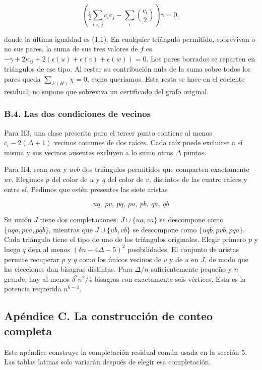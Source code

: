 \documentclass[spanish,11pt,a4paper]{article}
\begin{document}
\[\left(\tfrac12\sum_{i<j}c_ic_j-\sum_i\binom{c_i}{2}\right)\gamma=0,\]

donde la última igualdad es (1.1). En cualquier triángulo permitido, sobrevivan o no sus pares, la suma de sus tres valores de \(f\) es \(-\gamma+2\kappa_{ij}+2(\epsilon(u)+\epsilon(v)+\epsilon(w))=0\). Los pares borrados se reparten en triángulos de ese tipo. Al restar su contribución nula de la suma sobre todos los pares queda \(\sum_{E(H)}\chi=0\), como queríamos. Esta resta se hace en el cociente residual; no supone que sobreviva un certificado del grafo original.

\subsubsection{B.4. Las dos condiciones de vecinos}\label{b.4.-las-dos-condiciones-de-vecinos}

Para H3, una clase prescrita para el tercer punto contiene al menos \(c_i-2(\Delta+1)\) vecinos comunes de dos raíces. Cada raíz puede excluirse a sí misma y sus vecinos ausentes excluyen a lo sumo otros \(\Delta\) puntos.

Para H4, sean \(uva\) y \(uvb\) dos triángulos permitidos que comparten exactamente \(uv\). Elegimos \(p\) del color de \(u\) y \(q\) del color de \(v\), distintos de las cuatro raíces y entre sí. Pedimos que estén presentes las siete aristas

\[uq,\ pv,\ pq,\ pa,\ pb,\ qa,\ qb\]

Su unión \(J\) tiene dos completaciones: \(J\cup\{ua,va\}\) se descompone como \(\{uqa,pva,pqb\}\), mientras que \(J\cup\{ub,vb\}\) se descompone como \(\{uqb,pvb,pqa\}\). Cada triángulo tiene el tipo de uno de los triángulos originales. Elegir primero \(p\) y luego \(q\) deja al menos \((\delta n-4\Delta-5)^2\) posibilidades. El conjunto de aristas permite recuperar \(p\) y \(q\) como los únicos vecinos de \(v\) y de \(u\) en \(J\), de modo que las elecciones dan bisagras distintas. Para \(\Delta/n\) suficientemente pequeño y \(n\) grande, hay al menos \(\delta^2n^2/4\) bisagras con exactamente seis vértices. Esta es la potencia requerida \(n^{6-4}\).

\subsection{Apéndice C. La construcción de conteo completa}\label{apuxe9ndice-c.-la-construcciuxf3n-de-conteo-completa}

Este apéndice construye la completación residual común usada en la sección 5. Las tablas latinas solo variarán después de elegir esa completación.
\end{document}
